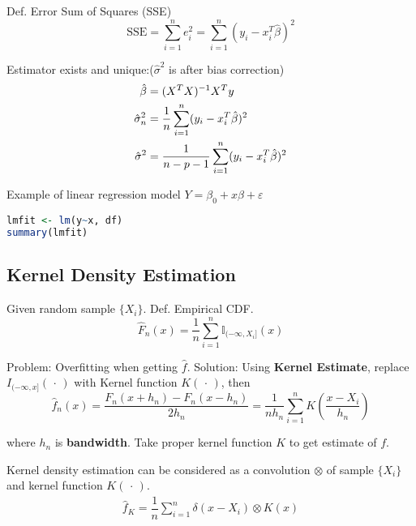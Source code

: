     Def. Error Sum of Squares (SSE)
    \begin{equation}\mathrm{SSE}=\sum_{i=1}^ne_i^2=\sum_{i=1}^n(y_i-x_i^T\hat{\beta })^2\end{equation}

    Estimator exists and unique:($\hat{\sigma}^2$ is after bias correction)
    \begin{align}
        \hat{\beta}&=(X^TX)^{-1}X^Ty\notag \\
        \hat{\sigma}_n^2&=\frac{1}{n}\sum_{i=1}^n(y_i-x^T_i\hat{\beta})^2 \notag\\ 
        \hat{\sigma}^2&=\frac{1}{n-p-1}\sum_{i=1}^n(y_i-x_i^T\hat{\beta})^2\label{EqaEstimatorSigmaWithDoF}
    \end{align}

\begin{rcode}
    Example of linear regression model $ Y = \beta _0+x\beta +\varepsilon  $
\begin{lstlisting}[language=R]
lmfit <- lm(y~x, df)
summary(lmfit)
\end{lstlisting}
\end{rcode}

    

\subsection{Kernel Density Estimation}\label{SubSectionKernelDensityEstimation}
    Given random sample $\{X_i\}$. Def. Empirical CDF.
    \begin{equation}\label{empiricaldisreibutionfunction}
        \hat{F}_n(x)=\frac{1}{n}\sum_{i=1}^n\mathbb{I}_{(-\infty,X_i]}(x) 
    \end{equation}
        

    Problem: Overfitting when getting $\hat{f}$. Solution: Using \textbf{Kernel Estimate}, replace $I_{(-\infty,x]}(\,\cdot\,)$ with Kernel function $K(\,\cdot\,)$, then
    \begin{equation}
        \hat{f}_n(x)=\dfrac{F_n(x+h_n)-F_n(x-h_n)}{2h_n}=\frac{1}{nh_n}\sum_{i=1}^nK(\frac{x-X_i}{h_n})
    \end{equation}

    where $h_n$ is \textbf{bandwidth}. Take proper kernel function $K$ to get estimate of $f$.

    Kernel density estimation can be considered as a convolution $ \otimes $ of sample $\{X_i\}$ and kernel function $K(\, \cdot \, )$.
    \begin{align}
        \hat{f}_K= \dfrac{1}{n}\sum_{i=1}^n\delta (x-X_i) \otimes K(x)
    \end{align}
    
